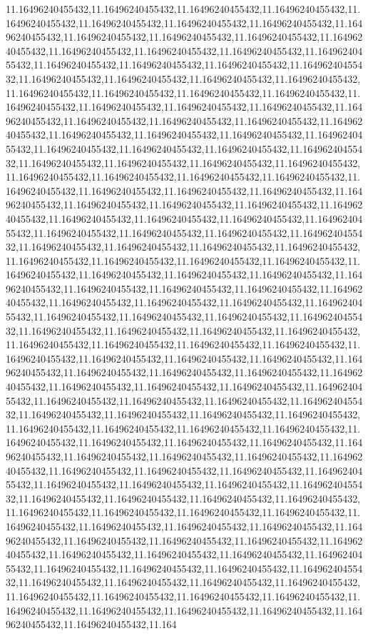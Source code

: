11.16496240455432,11.16496240455432,11.16496240455432,11.16496240455432,11.16496240455432,11.16496240455432,11.16496240455432,11.16496240455432,11.16496240455432,11.16496240455432,11.16496240455432,11.16496240455432,11.16496240455432,11.16496240455432,11.16496240455432,11.16496240455432,11.16496240455432,11.16496240455432,11.16496240455432,11.16496240455432,11.16496240455432,11.16496240455432,11.16496240455432,11.16496240455432,11.16496240455432,11.16496240455432,11.16496240455432,11.16496240455432,11.16496240455432,11.16496240455432,11.16496240455432,11.16496240455432,11.16496240455432,11.16496240455432,11.16496240455432,11.16496240455432,11.16496240455432,11.16496240455432,11.16496240455432,11.16496240455432,11.16496240455432,11.16496240455432,11.16496240455432,11.16496240455432,11.16496240455432,11.16496240455432,11.16496240455432,11.16496240455432,11.16496240455432,11.16496240455432,11.16496240455432,11.16496240455432,11.16496240455432,11.16496240455432,11.16496240455432,11.16496240455432,11.16496240455432,11.16496240455432,11.16496240455432,11.16496240455432,11.16496240455432,11.16496240455432,11.16496240455432,11.16496240455432,11.16496240455432,11.16496240455432,11.16496240455432,11.16496240455432,11.16496240455432,11.16496240455432,11.16496240455432,11.16496240455432,11.16496240455432,11.16496240455432,11.16496240455432,11.16496240455432,11.16496240455432,11.16496240455432,11.16496240455432,11.16496240455432,11.16496240455432,11.16496240455432,11.16496240455432,11.16496240455432,11.16496240455432,11.16496240455432,11.16496240455432,11.16496240455432,11.16496240455432,11.16496240455432,11.16496240455432,11.16496240455432,11.16496240455432,11.16496240455432,11.16496240455432,11.16496240455432,11.16496240455432,11.16496240455432,11.16496240455432,11.16496240455432,11.16496240455432,11.16496240455432,11.16496240455432,11.16496240455432,11.16496240455432,11.16496240455432,11.16496240455432,11.16496240455432,11.16496240455432,11.16496240455432,11.16496240455432,11.16496240455432,11.16496240455432,11.16496240455432,11.16496240455432,11.16496240455432,11.16496240455432,11.16496240455432,11.16496240455432,11.16496240455432,11.16496240455432,11.16496240455432,11.16496240455432,11.16496240455432,11.16496240455432,11.16496240455432,11.16496240455432,11.16496240455432,11.16496240455432,11.16496240455432,11.16496240455432,11.16496240455432,11.16496240455432,11.16496240455432,11.16496240455432,11.16496240455432,11.16496240455432,11.16496240455432,11.16496240455432,11.16496240455432,11.16496240455432,11.16496240455432,11.16496240455432,11.16496240455432,11.16496240455432,11.16496240455432,11.16496240455432,11.16496240455432,11.16496240455432,11.16496240455432,11.16496240455432,11.16496240455432,11.16496240455432,11.16496240455432,11.16496240455432,11.16496240455432,11.16496240455432,11.16496240455432,11.16496240455432,11.16496240455432,11.16496240455432,11.16496240455432,11.16496240455432,11.16496240455432,11.16496240455432,11.16496240455432,11.16496240455432,11.16496240455432,11.16496240455432,11.16496240455432,11.16496240455432,11.16496240455432,11.16496240455432,11.16496240455432,11.16496240455432,11.16496240455432,11.16496240455432,11.16496240455432,11.16496240455432,11.16496240455432,11.16496240455432,11.16496240455432,11.16496240455432,11.16496240455432,11.16496240455432,11.164